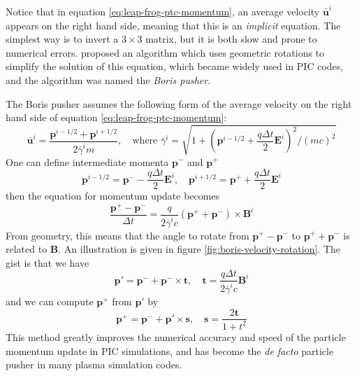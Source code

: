 Notice that in equation \eqref{eq:leap-frog-ptc-momentum}, an average velocity
$\mathbf{\bar{u}}^{i}$ appears on the right hand side, meaning that this
is an {\it implicit} equation. The simplest way is to invert a $3\times 3$
matrix, but it is both slow and prone to numerical errors.
\citet{boris_relativistic_1970} proposed an algorithm which uses geometric
rotations to simplify the solution of this equation, which became widely used in
PIC codes, and the algorithm was named the {\it Boris pusher}.

The Boris pusher assumes the following form of the average velocity on the right
hand side of equation \eqref{eq:leap-frog-ptc-momentum}:
\begin{equation}
  \label{eq:boris-average-u}
  \mathbf{\bar{u}}^{i} = \frac{\mathbf{p}^{i-1/2} + \mathbf{p}^{i+1/2}}{2\bar{\gamma}^im},\quad \text{where } \bar{\gamma}^i = \sqrt{1 + \left( \mathbf{p}^{i-1/2} + \frac{q\Delta t}{2}\mathbf{E}^i \right)^2/(mc)^2}
\end{equation}
One can define intermediate momenta $\mathbf{p}^{-}$ and $\mathbf{p}^+$
\begin{equation}
  \label{eq:boris-intermediate-momenta}
  \mathbf{p}^{i-1/2} = \mathbf{p}^{-} - \frac{q\Delta t}{2}\mathbf{E}^{i},\quad \mathbf{p}^{i+1/2} = \mathbf{p}^{+} + \frac{q\Delta t}{2}\mathbf{E}^i
\end{equation}
then the equation for momentum update becomes
\begin{equation}
  \label{eq:boris-momentum-update}
  \frac{\mathbf{p}^+-\mathbf{p}^{-}}{\Delta t} = \frac{q}{2 \bar{\gamma}^ic}(\mathbf{p}^+ + \mathbf{p}^{-})\times \mathbf{B}^{i}
\end{equation}
From geometry, this means that the angle to rotate from
$\mathbf{p}^+-\mathbf{p}^{-}$ to $\mathbf{p}^++\mathbf{p}^{-}$ is related to
$\mathbf{B}$. An illustration is given in figure
\ref{fig:boris-velocity-rotation}. The gist is that we have
\begin{equation}
  \mathbf{p}' = \mathbf{p}^{-} + \mathbf{p}^{-}\times \mathbf{t},\quad \mathbf{t} = \frac{q\Delta t}{2\bar{\gamma}^ic}\mathbf{B}^{i}
\end{equation}
and we can compute $\mathbf{p}^{+}$ from $\mathbf{p}'$ by
\begin{equation}
  \mathbf{p}^+ = \mathbf{p}^{-} + \mathbf{p}'\times \mathbf{s},\quad \mathbf{s} = \frac{2\mathbf{t}}{1 + t^2}
\end{equation}
This method greatly improves the numerical accuracy and speed of the particle
momentum update in PIC simulations, and has become the {\it de facto} particle
pusher in many plasma simulation codes.

